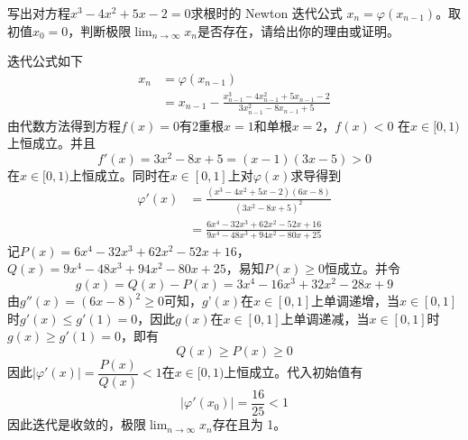 \documentclass[11pt]{article}
\begin{document}
\begin{question}

    \questiontext
    {
        写出对方程$x^3 - 4x^2 + 5x - 2 =0$求根时的 Newton 迭代公式 $x_n = \varphi(x_{n - 1})$。取初值$x_0 = 0$，判断极限$\displaystyle \lim_{n \rightarrow \infty}{x_n}$是否存在，请给出你的理由或证明。
    }

    \answer
    {
    迭代公式如下
    \begin{align*}
        x_n & = \varphi(x_{n - 1})                                                                            \\
            & = x_{n - 1} - \frac{x_{n - 1}^3 - 4x_{n - 1}^2 + 5x_{n - 1} - 2}{3x_{n - 1}^2 - 8x_{n - 1} + 5}
    \end{align*}
    由代数方法得到方程$f(x) = 0$有2重根$x = 1$和单根$x = 2$，$f(x) < 0$ 在$x \in [0, 1)$上恒成立。并且 $$f'(x) = 3 x^2 - 8 x + 5  = (x-1) (3 x-5) > 0$$ 在$x \in [0, 1)$上恒成立。同时在$x \in [0, 1]$上对$\varphi(x)$求导得到
    \begin{align*}
        \varphi'(x) & = \frac{(x^3 - 4x^2 + 5x - 2)(6x - 8)}{(3x^2 - 8x + 5)^2}         \\
                    & = \frac{6 x^4-32 x^3+62 x^2-52 x+16}{9 x^4-48 x^3+94 x^2-80 x+25}
    \end{align*}
    记$P(x) = 6 x^4-32 x^3+62 x^2-52 x+16$，$Q(x) = 9 x^4-48 x^3+94 x^2-80 x+25$，易知$P(x) \geqslant 0$恒成立。并令
    \begin{equation*}
        g(x) = Q(x) - P(x) = 3 x^4-16 x^3+32 x^2-28 x+9
    \end{equation*}
    由$g''(x) = (6x - 8)^2 \geqslant 0$可知，$g’(x)$在$x \in [0, 1]$上单调递增，当$x \in [0, 1]$时$g'(x) \leqslant g'(1) = 0$，因此$g(x)$在$x \in [0, 1]$上单调递减，当$x \in [0, 1]$时$g(x) \geqslant g'(1) = 0$，即有
    \begin{equation*}
        Q(x) \geqslant P(x) \geqslant 0
    \end{equation*}
    因此$\left|\varphi'(x)\right| = \dfrac{P(x)}{Q(x)} < 1$在$x \in [0, 1)$上恒成立。代入初始值有
    \begin{equation*}
        \left|\varphi'(x_0)\right| = \frac{16}{25} < 1
    \end{equation*}
    因此迭代是收敛的，极限$\displaystyle \lim_{n \rightarrow \infty}{x_n}$存在且为 1。
    }

\end{question}
\end{document}
